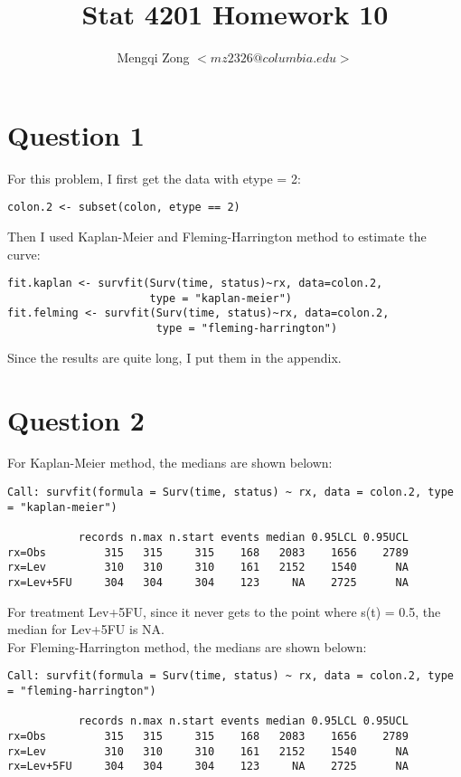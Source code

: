 \documentclass[12pt]{article}
\title{Stat 4201 Homework 10}
\author{Mengqi Zong $<mz2326@columbia.edu>$}
\begin{document}
\maketitle

\setlength{\parindent}{0in}

\section*{Question 1}

For this problem, I first get the data with etype = 2:

\begin{verbatim}
colon.2 <- subset(colon, etype == 2)
\end{verbatim}

Then I used Kaplan-Meier and Fleming-Harrington method to estimate the
curve:

\begin{verbatim}
fit.kaplan <- survfit(Surv(time, status)~rx, data=colon.2,
                      type = "kaplan-meier")
fit.felming <- survfit(Surv(time, status)~rx, data=colon.2,
                       type = "fleming-harrington")
\end{verbatim}

Since the results are quite long, I put them in the appendix.

\section*{Question 2}
 
For Kaplan-Meier method, the medians are shown belown:

\begin{verbatim}
Call: survfit(formula = Surv(time, status) ~ rx, data = colon.2, type = "kaplan-meier")

           records n.max n.start events median 0.95LCL 0.95UCL
rx=Obs         315   315     315    168   2083    1656    2789
rx=Lev         310   310     310    161   2152    1540      NA
rx=Lev+5FU     304   304     304    123     NA    2725      NA
\end{verbatim}

For treatment Lev+5FU, since it never gets to the point where s(t) =
0.5, the median for Lev+5FU is NA. \\

For Fleming-Harrington method, the medians are shown belown:

\begin{verbatim}
Call: survfit(formula = Surv(time, status) ~ rx, data = colon.2, type = "fleming-harrington")

           records n.max n.start events median 0.95LCL 0.95UCL
rx=Obs         315   315     315    168   2083    1656    2789
rx=Lev         310   310     310    161   2152    1540      NA
rx=Lev+5FU     304   304     304    123     NA    2725      NA
\end{verbatim}
\end{document}
